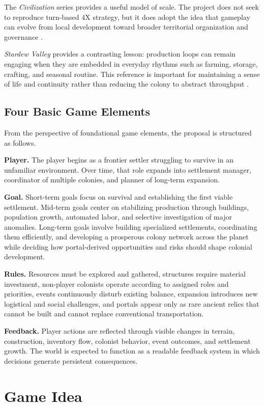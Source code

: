 \documentclass[conference]{IEEEtran}
\begin{document}
The \textit{Civilization} series provides a useful model of scale. The project does not seek to reproduce turn-based 4X strategy, but it does adopt the idea that gameplay can evolve from local development toward broader territorial organization and governance \cite{civilization}.

\textit{Stardew Valley} provides a contrasting lesson: production loops can remain engaging when they are embedded in everyday rhythms such as farming, storage, crafting, and seasonal routine. This reference is important for maintaining a sense of life and continuity rather than reducing the colony to abstract throughput \cite{stardew}.

\subsection{Four Basic Game Elements}
From the perspective of foundational game elements, the proposal is structured as follows.

\textbf{Player.} The player begins as a frontier settler struggling to survive in an unfamiliar environment. Over time, that role expands into settlement manager, coordinator of multiple colonies, and planner of long-term expansion.

\textbf{Goal.} Short-term goals focus on survival and establishing the first viable settlement. Mid-term goals center on stabilizing production through buildings, population growth, automated labor, and selective investigation of major anomalies. Long-term goals involve building specialized settlements, coordinating them efficiently, and developing a prosperous colony network across the planet while deciding how portal-derived opportunities and risks should shape colonial development.

\textbf{Rules.} Resources must be explored and gathered, structures require material investment, non-player colonists operate according to assigned roles and priorities, events continuously disturb existing balance, expansion introduces new logistical and social challenges, and portals appear only as rare ancient relics that cannot be built and cannot replace conventional transportation.

\textbf{Feedback.} Player actions are reflected through visible changes in terrain, construction, inventory flow, colonist behavior, event outcomes, and settlement growth. The world is expected to function as a readable feedback system in which decisions generate persistent consequences.

\section{Game Idea}
\end{document}
